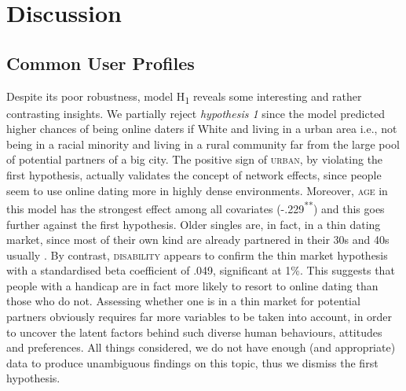 
\lhead[\leftmark]{\leftmark}

\rhead[\leftmark]{}

\lfoot{}

\rfoot{}

\cfoot[\thepage]{\thepage}

\chapter{Discussion}

\section{Common User Profiles}

Despite its poor robustness, model H\textsubscript{1} reveals some
interesting and rather contrasting insights. We partially reject \textsl{hypothesis
1} since the model predicted higher chances of being online daters
if White and living in a urban area \textendash{} i.e., not being
in a racial minority and living in a rural community far from the
large pool of potential partners of a big city. The positive sign
of \textsc{urban}, by violating the first hypothesis, actually validates
the concept of network effects, since people seem to use online dating
more in highly dense environments. Moreover, \textsc{age} in this
model has the strongest effect among all covariates (-.229\textsuperscript{{*}{*}})
and this goes further against the first hypothesis. Older singles
are, in fact, in a thin dating market, since most of their own kind
are already partnered in their 30s and 40s usually \citep{Michael-J.-Rosenfeld2012Searching-for-a}.
By contrast, \textsc{disability} appears to confirm the thin market
hypothesis with a standardised beta coefficient of .049, significant
at 1\%. This suggests that people with a handicap are in fact more
likely to resort to online dating than those who do not. Assessing
whether one is in a thin market for potential partners obviously requires
far more variables to be taken into account, in order to uncover the
latent factors behind such diverse human behaviours, attitudes and
preferences. All things considered, we do not have enough (and appropriate)
data to produce unambiguous findings on this topic, thus we dismiss
the first hypothesis. 

